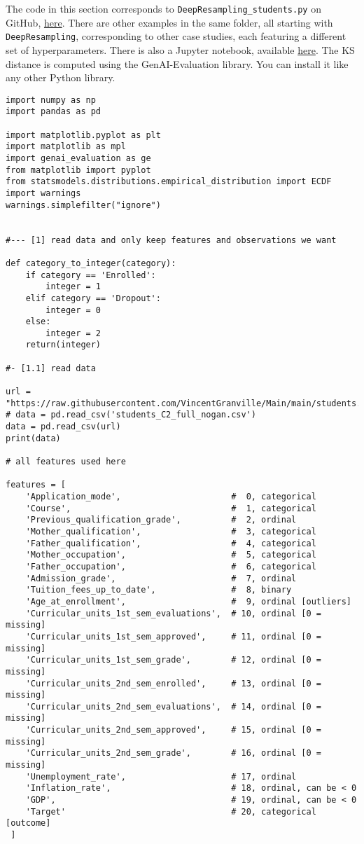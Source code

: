 \documentclass[oneside,10pt]{book}
\begin{document}
The code in this section corresponds to \texttt{DeepResampling\_students.py} on GitHub, \href{https://github.com/VincentGranville/Main/blob/main/DeepResampling_students.py}{here}. There are other examples in the same folder, all starting with \texttt{DeepResampling}, corresponding to
 other case studies, each featuring a different set of hyperparameters. There is also a Jupyter notebook, available
 \href{https://github.com/VincentGranville/Notebooks/blob/main/DeepResampling.ipynb}{here}. The KS distance is computed using the
 GenAI-Evaluation library. You can install it like any other Python library.


\vspace{1ex}

\begin{lstlisting}
import numpy as np
import pandas as pd

import matplotlib.pyplot as plt
import matplotlib as mpl
import genai_evaluation as ge
from matplotlib import pyplot
from statsmodels.distributions.empirical_distribution import ECDF
import warnings
warnings.simplefilter("ignore")


#--- [1] read data and only keep features and observations we want

def category_to_integer(category):
    if category == 'Enrolled':
        integer = 1
    elif category == 'Dropout':
        integer = 0
    else:
        integer = 2
    return(integer)

#- [1.1] read data

url = "https://raw.githubusercontent.com/VincentGranville/Main/main/students.csv"
# data = pd.read_csv('students_C2_full_nogan.csv')
data = pd.read_csv(url)
print(data)

# all features used here

features = [
    'Application_mode',                      #  0, categorical
    'Course',                                #  1, categorical
    'Previous_qualification_grade',          #  2, ordinal
    'Mother_qualification',                  #  3, categorical
    'Father_qualification',                  #  4, categorical
    'Mother_occupation',                     #  5, categorical
    'Father_occupation',                     #  6, categorical
    'Admission_grade',                       #  7, ordinal
    'Tuition_fees_up_to_date',               #  8, binary
    'Age_at_enrollment',                     #  9, ordinal [outliers]
    'Curricular_units_1st_sem_evaluations',  # 10, ordinal [0 = missing]
    'Curricular_units_1st_sem_approved',     # 11, ordinal [0 = missing]
    'Curricular_units_1st_sem_grade',        # 12, ordinal [0 = missing]
    'Curricular_units_2nd_sem_enrolled',     # 13, ordinal [0 = missing]
    'Curricular_units_2nd_sem_evaluations',  # 14, ordinal [0 = missing]
    'Curricular_units_2nd_sem_approved',     # 15, ordinal [0 = missing]
    'Curricular_units_2nd_sem_grade',        # 16, ordinal [0 = missing]
    'Unemployment_rate',                     # 17, ordinal
    'Inflation_rate',                        # 18, ordinal, can be < 0
    'GDP',                                   # 19, ordinal, can be < 0
    'Target'                                 # 20, categorical [outcome]
 ]


\end{lstlisting}
\end{document}
